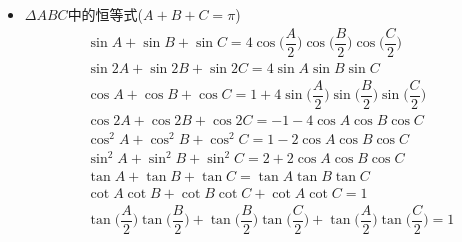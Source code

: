\begin{itemize}[leftmargin=\inteval{\myitemleftmargin}pt,itemsep=
   \inteval{\myitemitempsep}pt,topsep=\inteval{\myitemtopsep}pt]
\item $ \Delta ABC $中的恒等式($ A+B+C=\pi $)
\begin{align} 
    &\sin A +\sin B +\sin C =4\cos\Big(\dfrac{A}{2}\Big)
    \cos\Big(\dfrac{B}{2}\Big)\cos\Big(\dfrac{C}{2}\Big) \label{三角恒等式1} \\
    &\sin2A +\sin2B +\sin2C =4\sin A  \sin B \sin C \label{三角恒等式2}\\
    &\cos A +\cos B +\cos C =1+4\sin\Big(\dfrac{A}{2}\Big)
    \sin\Big(\dfrac{B}{2}\Big)\sin\Big(\dfrac{C}{2}\Big) \label{三角恒等式3} \\
    &\cos2A +\cos2B +\cos2C =-1-4\cos A\cos B \cos C \label{三角恒等式4} \\	
    &\cos^2A+\cos^2B+\cos^2C =1-2\cos A\cos B\cos C \label{三角恒等式5} \\ 
    &\sin^2A+\sin^2B+\sin^2C =2+2\cos A\cos B\cos C \label{三角恒等式6} \\
    &\tan A+\tan B +\tan C =\tan A \tan B\tan C \label{三角恒等式7}\\
    &\cot A\cot B+\cot B \cot C+\cot A\cot C=1 \label{三角恒等式8}\\
    &\tan\Big(\dfrac{A}{2}\Big)\tan\Big(\dfrac{B}{2}\Big)+
    \tan\Big(\dfrac{B}{2}\Big)\tan\Big(\dfrac{C}{2}\Big)+
    \tan\Big(\dfrac{A}{2}\Big)\tan\Big(\dfrac{C}{2}\Big)=1 \label{三角恒等式-最后}
\end{align}


\end{itemize}
